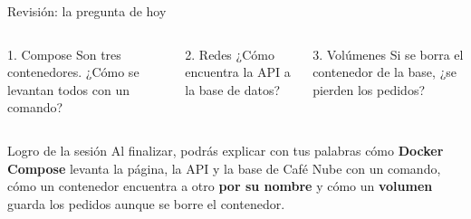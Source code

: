 \documentclass[aspectratio=169,10pt,c]{beamer}
\begin{document}
\begin{frame}{Revisión: la pregunta de hoy}
\begin{center}
\end{center}
\vspace{3mm}
\begin{columns}[T,onlytextwidth]
\begin{block}{1. Compose}
\small Son tres contenedores. ¿Cómo se levantan todos con un comando?
\end{block}
\begin{block}{2. Redes}
\small ¿Cómo encuentra la API a la base de datos?
\end{block}
\begin{block}{3. Volúmenes}
\small Si se borra el contenedor de la base, ¿se pierden los pedidos?
\end{block}
\end{columns}
\end{frame}

\begin{frame}[c]
\begin{block}{Logro de la sesión}
Al finalizar, podrás explicar con tus palabras cómo \textbf{Docker Compose} levanta la página, la API y la base de Café Nube con un comando, cómo un contenedor encuentra a otro \textbf{por su nombre} y cómo un \textbf{volumen} guarda los pedidos aunque se borre el contenedor.
\end{block}
\end{frame}
\end{document}
